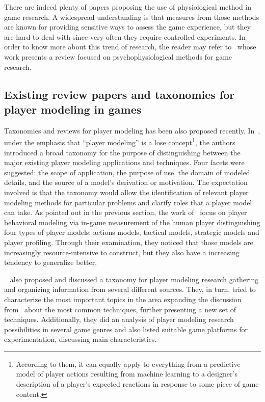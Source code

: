 There are indeed plenty of papers proposing the use of physiological method in game research. A widespread understanding is that measures from those methods are known for providing sensitive ways to assess the game experience, but they are hard to deal with since very often they require controlled experiments. In order to know more about this trend of research, the reader may refer to~\cite{kivikangas2011review} whose work presents a review focused on psychophysiological methods for game research.   
 
\subsection{Existing review papers and taxonomies for player modeling in games}\label{reviews}
Taxonomies and reviews for player modeling has been also proposed recently. In~\cite{smith2011inclusive}, under the emphasis that ``player modeling'' is a lose concept\footnote{According to them, it can equally apply to everything from a predictive model of player actions resulting from machine learning to a designer's description of a player's expected reactions in response to some piece of game content.}, the authors introduced a broad taxonomy for the purpose of distinguishing between the major existing player modeling applications and techniques. Four facets were suggested: the scope of application, the purpose of use, the domain of modeled details, and the source of a model's derivation or motivation. The expectation involved is that the taxonomy would allow the identification of relevant player modeling methods for particular problems and clarify roles that a player model can take. As pointed out in the previous section, the work of~\cite{bakkes2012player} focus on player behavioral modeling via in-game measurement of the human player distinguishing four types of player models: actions models, tactical models, strategic models and player profiling. Through their examination, they noticed that those models are increasingly resource-intensive to construct, but they also have a increasing tendency to generalize better.

~\cite{machado_pmodeling_2011} also proposed and discussed a taxonomy for player modeling research gathering and organizing information from several different sources. They, in turn, tried to characterize the most important topics in the area expanding the discussion from~\cite{Herik_opponentmodelling} about the most common techniques, further presenting a new set of techniques. Additionally, they did an analysis of player modeling research possibilities in several game genres and also listed suitable game platforms for experimentation, discussing main characteristics.

